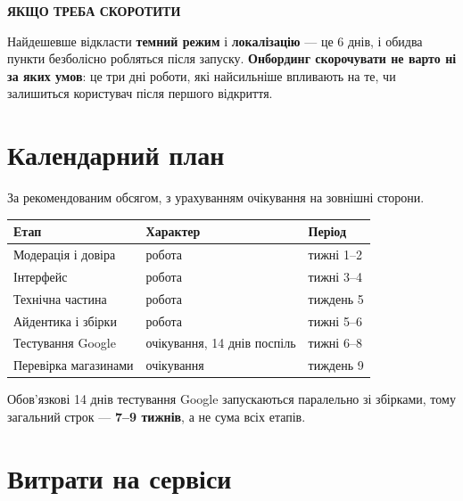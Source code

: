 \documentclass[11pt,a4paper]{article}
\newcommand{\thead}[1]{{\color{muted}\footnotesize\bfseries #1}}
\newcommand{\notelbl}[2]{{\color{#1}\footnotesize\bfseries\MakeUppercase{#2}}\par\vspace{3pt}}
\begin{document}
\vspace{10pt}

\begin{notepos}
\notelbl{accent}{Якщо треба скоротити}
Найдешевше відкласти \textbf{темний режим} і \textbf{локалізацію} --- це 6 днів,
і обидва пункти безболісно робляться після запуску. \textbf{Онбординг
скорочувати не варто ні за яких умов}: це три дні роботи, які найсильніше
впливають на те, чи залишиться користувач після першого відкриття.
\end{notepos}

\section{Календарний план}

За рекомендованим обсягом, з урахуванням очікування на зовнішні сторони.

\vspace{6pt}
\begin{xltabular}{\textwidth}{N{5.2cm} Y L{2.8cm}}
\toprule
\thead{Етап} & \thead{Характер} & \thead{Період} \\
\midrule
Модерація і довіра        & робота                                & тижні 1--2 \\
Інтерфейс                 & робота                                & тижні 3--4 \\
Технічна частина          & робота                                & тиждень 5 \\
Айдентика і збірки        & робота                                & тижні 5--6 \\
Тестування Google         & {\color{warn}очікування, 14 днів поспіль} & тижні 6--8 \\
Перевірка магазинами      & {\color{warn}очікування}              & тиждень 9 \\
\bottomrule
\end{xltabular}

\vspace{6pt}
Обов'язкові 14 днів тестування Google запускаються паралельно зі збірками,
тому загальний строк --- \textbf{7--9 тижнів}, а не сума всіх етапів.

\section{Витрати на сервіси}
\end{document}
